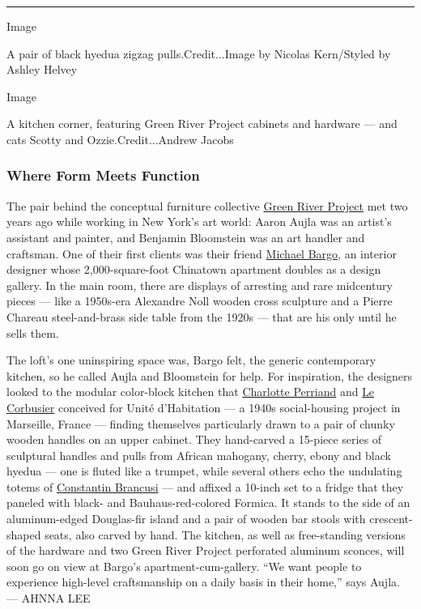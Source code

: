 \begin{center}\rule{0.5\linewidth}{\linethickness}\end{center}

Image

A pair of black hyedua zigzag pulls.Credit...Image by Nicolas
Kern/Styled by Ashley Helvey

Image

A kitchen corner, featuring Green River Project cabinets and hardware
--- and cats Scotty and Ozzie.Credit...Andrew Jacobs

\hypertarget{where-form-meets-function}{%
\subsubsection{Where Form Meets
Function}\label{where-form-meets-function}}

The pair behind the conceptual furniture collective
\href{https://www.nytimes3xbfgragh.onion/2019/08/07/t-magazine/green-river-project-aaron-aujla-ben-bloomstein.html}{Green
River Project} met two years ago while working in New York's art world:
Aaron Aujla was an artist's assistant and painter, and Benjamin
Bloomstein was an art handler and craftsman. One of their first clients
was their friend
\href{https://www.nytimes3xbfgragh.onion/2017/04/11/t-magazine/design/michael-bargo-apartment.html}{Michael
Bargo}, an interior designer whose 2,000-square-foot Chinatown apartment
doubles as a design gallery. In the main room, there are displays of
arresting and rare midcentury pieces --- like a 1950s-era Alexandre Noll
wooden cross sculpture and a Pierre Chareau steel-and-brass side table
from the 1920s --- that are his only until he sells them.

The loft's one uninspiring space was, Bargo felt, the generic
contemporary kitchen, so he called Aujla and Bloomstein for help. For
inspiration, the designers looked to the modular color-block kitchen
that
\href{https://www.nytimes3xbfgragh.onion/2013/11/14/t-magazine/charlotte-perriand-design-le-corbusier.html}{Charlotte
Perriand} and
\href{https://www.nytimes3xbfgragh.onion/2018/08/08/t-magazine/le-corbusier-japan-modernism.html}{Le
Corbusier} conceived for Unité d'Habitation --- a 1940s social-housing
project in Marseille, France --- finding themselves particularly drawn
to a pair of chunky wooden handles on an upper cabinet. They hand-carved
a 15-piece series of sculptural handles and pulls from African mahogany,
cherry, ebony and black hyedua --- one is fluted like a trumpet, while
several others echo the undulating totems of
\href{https://www.nytimes3xbfgragh.onion/2016/09/22/t-magazine/art/impasse-ronsin-artists-montparnasse-constantin-brancusi.html}{Constantin
Brancusi} --- and affixed a 10-inch set to a fridge that they paneled
with black- and Bauhaus-red-colored Formica. It stands to the side of an
aluminum-edged Douglas-fir island and a pair of wooden bar stools with
crescent-shaped seats, also carved by hand. The kitchen, as well as
free-standing versions of the hardware and two Green River Project
perforated aluminum sconces, will soon go on view at Bargo's
apartment-cum-gallery. ``We want people to experience high-level
craftsmanship on a daily basis in their home,'' says Aujla. --- AHNNA
LEE

